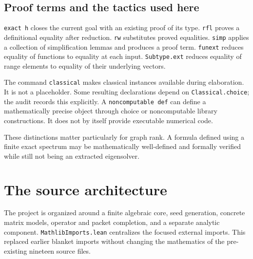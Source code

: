\documentclass[11pt,a4paper]{article}
\newcommand{\code}[1]{\nolinkurl{#1}}
\begin{document}
\subsection{Proof terms and the tactics used here}

\code{exact h} closes the current goal with an existing proof of its type. \code{rfl} proves a definitional equality after reduction. \code{rw} substitutes proved equalities. \code{simp} applies a collection of simplification lemmas and produces a proof term. \code{funext} reduces equality of functions to equality at each input. \code{Subtype.ext} reduces equality of range elements to equality of their underlying vectors.

The command \code{classical} makes classical instances available during elaboration. It is not a placeholder. Some resulting declarations depend on \code{Classical.choice}; the audit records this explicitly. A \code{noncomputable def} can define a mathematically precise object through choice or noncomputable library constructions. It does not by itself provide executable numerical code.

These distinctions matter particularly for graph rank. A formula defined using a finite exact spectrum may be mathematically well-defined and formally verified while still not being an extracted eigensolver.

\section{The source architecture}

The project is organized around a finite algebraic core, seed generation, concrete matrix models, operator and packet completion, and a separate analytic component. \code{MathlibImports.lean} centralizes the focused external imports. This replaced earlier blanket imports without changing the mathematics of the pre-existing nineteen source files.
\end{document}
